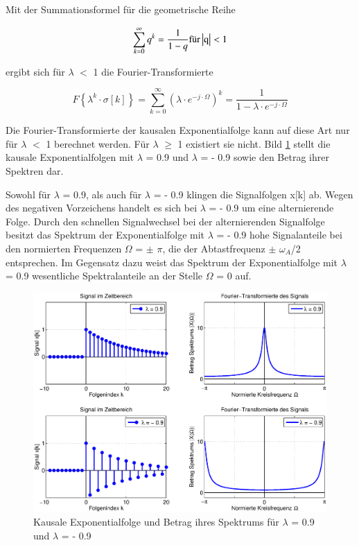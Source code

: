 \noindent Mit der Summationsformel f\"{u}r die geometrische Reihe 

\begin{equation}\label{eq:seventwentyseven}
\sum _{k=0}^{\infty }q^{k}=\frac{1}{1-q} \text{für} \left|{\rm q}\right|<1
\end{equation}

\noindent ergibt sich f\"{u}r {\textbar}$\lambda${\textbar} $\mathrm{<}$ 1 die Fourier-Transformierte

\begin{equation}\label{eq:seventwentyeight}
F\left\{\lambda ^{k} \cdot \sigma \left[k\right]\right\}=\sum _{k=0}^{\infty }\left(\lambda \cdot e^{-j\cdot \Omega } \right)^{k}  =\frac{1}{1-\lambda \cdot e^{-j\cdot \Omega } }
\end{equation}

\noindent Die Fourier-Transformierte der kausalen Exponentialfolge kann auf diese Art nur f\"{u}r {\textbar}$\lambda${\textbar} $\mathrm{<}$ 1 berechnet werden. F\"{u}r {\textbar}$\lambda${\textbar} $\mathrm{\ge}$ 1 existiert sie nicht. Bild \ref{fig:FourierEinseitigeExponentialfolge} stellt die kausale Exponentialfolgen mit $\lambda$ = 0.9 und $\lambda$ = - 0.9 sowie den Betrag ihrer Spektren dar.

\noindent Sowohl f\"{u}r $\lambda$ = 0.9, als auch f\"{u}r $\lambda$ = - 0.9 klingen die Signalfolgen x[k] ab. Wegen des negativen Vorzeichens handelt es sich bei $\lambda$ = - 0.9 um eine alternierende Folge. Durch den schnellen Signalwechsel bei der alternierenden Signalfolge besitzt das Spektrum der Exponentialfolge mit $\lambda$ = - 0.9 hohe Signalanteile bei den normierten Frequenzen $\Omega$ = $\mathrm{\pm}$ $\pi$, die der Abtastfrequenz $\mathrm{\pm}$ $\omega_{A}$/2 entsprechen. Im Gegensatz dazu weist das Spektrum der Exponentialfolge mit $\lambda$ = 0.9 wesentliche Spektralanteile an der Stelle $\Omega$ = 0 auf.

\begin{figure}[H]
  \centerline{\includegraphics[width=1\textwidth]{Kapitel7/Bilder/image3.eps}}
  \caption{Kausale Exponentialfolge und Betrag ihres Spektrums f\"{u}r $\lambda$ = 0.9 und $\lambda$ = - 0.9}
  \label{fig:FourierEinseitigeExponentialfolge}
\end{figure}

